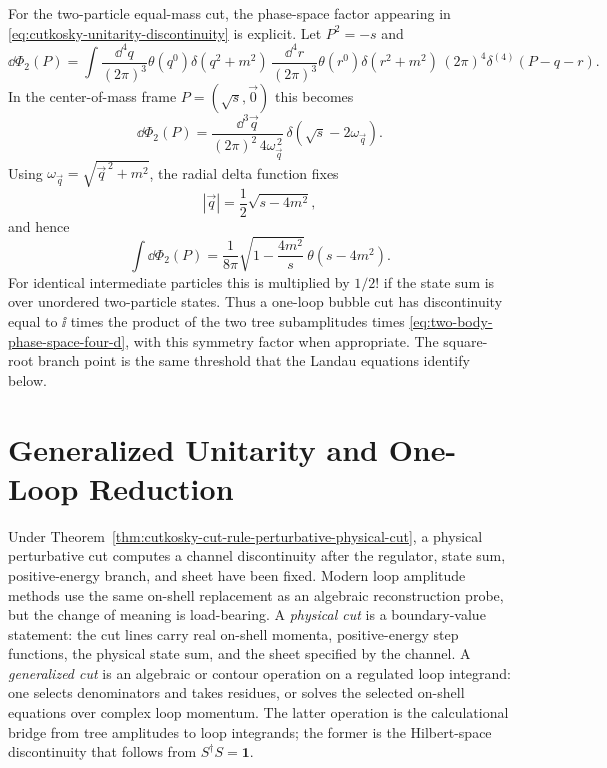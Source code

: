 For the two-particle equal-mass cut, the phase-space factor appearing in
\eqref{eq:cutkosky-unitarity-discontinuity} is explicit.  Let \(P^2=-s\) and
\[
  \dd\Phi_2(P)
  =
  \int
  \frac{\dd^4 q}{(2\pi)^3}\theta(q^0)\delta(q^2+m^2)\,
  \frac{\dd^4 r}{(2\pi)^3}\theta(r^0)\delta(r^2+m^2)\,
  (2\pi)^4\delta^{(4)}(P-q-r).
\]
In the center-of-mass frame \(P=(\sqrt s,\vec0)\) this becomes
\[
  \dd\Phi_2(P)
  =
  \frac{\dd^3\vec q}{(2\pi)^2\,4\omega_{\vec q}^{\,2}}\,
  \delta(\sqrt s-2\omega_{\vec q}).
\]
Using \(\omega_{\vec q}=\sqrt{\vec q^{\,2}+m^2}\), the radial delta function
fixes
\[
  |\vec q|=\frac12\sqrt{s-4m^2},
\]
and hence
\begin{equation}
  \int\dd\Phi_2(P)
  =
  \frac1{8\pi}
  \sqrt{1-\frac{4m^2}{s}}\,
  \theta(s-4m^2).
  \label{eq:two-body-phase-space-four-d}
\end{equation}
For identical intermediate particles this is multiplied by \(1/2!\) if the
state sum is over unordered two-particle states.  Thus a one-loop bubble cut
has discontinuity equal to \(\ii\) times the product of the two tree
subamplitudes times \eqref{eq:two-body-phase-space-four-d}, with this symmetry
factor when appropriate.  The square-root branch point is the same threshold
that the Landau equations identify below.

\section{Generalized Unitarity and One-Loop Reduction}
\label{sec:generalized-unitarity-one-loop-reduction}

Under Theorem~\ref{thm:cutkosky-cut-rule-perturbative-physical-cut}, a
physical perturbative cut computes a channel discontinuity after the regulator,
state sum, positive-energy branch, and sheet have been fixed.  Modern loop
amplitude methods use the same on-shell replacement as an algebraic
reconstruction probe, but the change of meaning is load-bearing.  A
\emph{physical cut} is a boundary-value statement: the cut lines carry real
on-shell momenta, positive-energy step functions, the physical state sum, and
the sheet specified by the channel.  A \emph{generalized cut} is an algebraic
or contour operation on a regulated loop integrand: one selects denominators
and takes residues, or solves the selected on-shell equations over complex
loop momentum.  The latter operation is the calculational bridge from tree
amplitudes to loop integrands; the former is the Hilbert-space discontinuity
that follows from \(S^\dagger S=\mathbf 1\).

